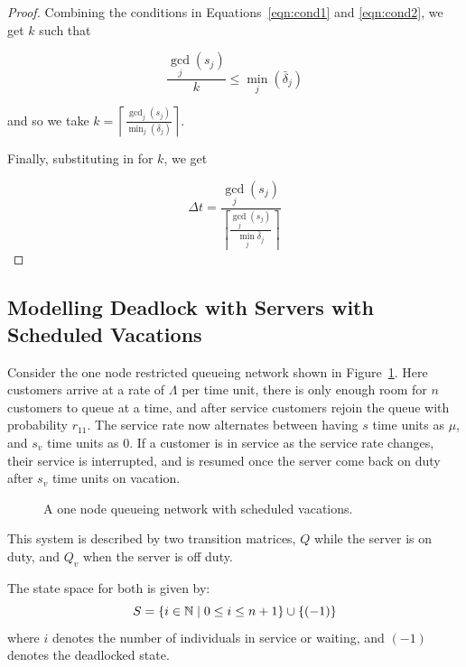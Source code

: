 \documentclass{article}
\begin{document}
\begin{proof}
Combining the conditions in Equations~\ref{eqn:cond1} and \ref{eqn:cond2}, we get $k$ such that

\begin{equation*}
\frac{\gcd_j(s_j)}{k} \leq \min_j(\bar{\delta}_j)
\end{equation*}

and so we take $k = \left\lceil \frac{\gcd_j(s_j)}{\min_j(\bar{\delta}_j)} \right\rceil$.

Finally, substituting in for $k$, we get

\begin{equation*}
\Delta t = \frac{\gcd_j(s_j)}{\left\lceil \frac{\gcd_j(s_j)}{\min_j \bar{\delta}_j} \right\rceil}
\end{equation*}

\end{proof}



\subsection{Modelling Deadlock with Servers with Scheduled Vacations}

Consider the one node restricted queueing network shown in Figure~\ref{fig:1nodescheduledvacations}.
Here customers arrive at a rate of $\Lambda$ per time unit, there is only enough room for $n$ customers to queue at a time, and after service customers rejoin the queue with probability $r_{11}$.
The service rate now alternates between having $s$ time units as $\mu$, and $s_v$ time units as $0$.
If a customer is in service as the service rate changes, their service is interrupted, and is resumed once the server come back on duty after $s_v$ time units on vacation.

\begin{figure}
    \begin{center}
        
    \end{center}
    \caption{A one node queueing network with scheduled vacations.}
    \label{fig:1nodescheduledvacations}
\end{figure}

This system is described by two transition matrices, $Q$ while the server is on duty, and $Q_v$ when the server is off duty.

The state space for both is given by:
        \[S = \{i\in\mathbb{N} \nonscript\; | \nonscript\; 0 \leq i \leq n + 1
        \}\cup\{(-1)\}\]
where \(i\) denotes the number of individuals in service or waiting, and $(-1)$ denotes the deadlocked state.
\end{document}
